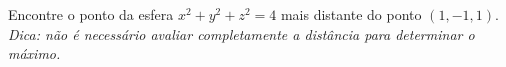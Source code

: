\documentclass[a4paper,12pt,fleqn]{article}
\newcommand{\comentario}[1]{{\color{magenta} #1 \par\vspace{\baselineskip}\par}}
\begin{document}

%

Encontre o ponto da esfera \(x^2+y^2+z^2=4\) mais distante do ponto \((1, -1, 1)\).\\
\textit{Dica: não é necessário avaliar completamente a distância para determinar o máximo.}
\end{document}
